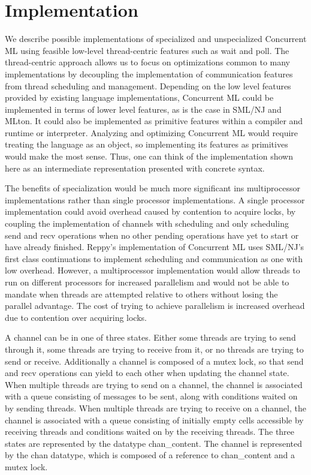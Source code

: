 \section{Implementation}
We describe possible implementations of specialized and unspecialized Concurrent ML using
feasible low-level thread-centric features such as wait and poll.  The thread-centric approach
allows us to focus on optimizations common to many implementations by decoupling the
implementation of communication features from thread scheduling and management.  Depending on
the low level features provided by existing language implementations, Concurrent ML could be
implemented in terms of lower level features, as is the case in SML/NJ and MLton.  It could
also be implemented as primitive features within a compiler and runtime or interpreter.
Analyzing and optimizing Concurrent ML would require treating the language as an object, so
implementing its features as primitives would make the most sense.  Thus, one can think of the
implementation shown here as an intermediate representation presented with concrete syntax.

The benefits of specialization would be much more significant ins multiprocessor
implementations rather than single processor implementations.  A single processor
implementation could avoid overhead caused by contention to acquire locks, by coupling the
implementation of channels with scheduling and only scheduling send and recv operations when no
other pending operations have yet to start or have already finished.  Reppy's implementation of
Concurrent ML uses SML/NJ's first class continuations to implement scheduling and communication
as one with low overhead.  However, a multiprocessor implementation would allow threads to run
on different processors for increased parallelism and would not be able to mandate when threads
are attempted relative to others without losing the parallel advantage.  The cost of trying to
achieve parallelism is increased overhead due to contention over acquiring locks.

A channel can be in one of three states.  Either some threads are trying to send through it,
some threads are trying to receive from it, or no threads are trying to send or receive.
Additionally a channel is composed of a mutex lock, so that send and recv operations can yield
to each other when updating the channel state.  When multiple threads are trying to send on a
channel, the channel is associated with a queue consisting of messages to be sent, along with
conditions waited on by sending threads. When multiple threads are trying to receive on a
channel, the channel is associated with a queue consisting of initially empty cells accessible
by receiving threads and conditions waited on by the receiving threads. The three states are
represented by the datatype chan\_content.  The channel is represented by the chan datatype,
which is composed of a reference to chan\_content and a mutex lock.  

